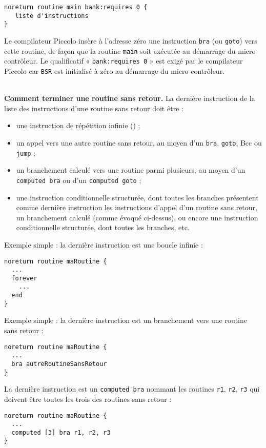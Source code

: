 \begin{lstlisting}[language=piccolo]
noreturn routine main bank:requires 0 {
   liste d'instructions
}

\end{lstlisting}

Le compilateur Piccolo insère à l’adresse zéro une instruction \texttt{bra} (ou \texttt{goto}) vers cette routine, de façon que la routine \texttt{main} soit exécutée au démarrage du micro-contrôleur. Le qualificatif « \texttt{bank:requires 0} » est exigé par le compilateur Piccolo car \texttt{BSR} est initialisé à zéro au démarrage du micro-contrôleur.


~\\
\textbf{Comment terminer une routine sans retour.} La dernière instruction de la liste des instructions d’une routine sans retour doit être :
\begin{itemize}
  \item une instruction de répétition infinie () ;
  \item un appel vers une autre routine sans retour, au moyen d’un \texttt{bra}, \texttt{goto}, Bcc ou \texttt{jump} ;
  \item un branchement calculé vers une routine parmi plusieurs, au moyen d’un \texttt{computed bra} ou d’un \texttt{computed goto} ;
  \item une instruction conditionnelle structurée, dont toutes les branches présentent comme dernière instruction les instructions d’appel d’un routine sans retour, un branchement calculé (comme évoqué ci-dessus), ou encore une instruction conditionnelle structurée, dont toutes les branches, etc.

\end{itemize}

Exemple simple : la dernière instruction est une boucle infinie :
\begin{lstlisting}[language=piccolo]
noreturn routine maRoutine {
  ...
  forever
    ...
  end
}
\end{lstlisting}

Exemple simple : la dernière instruction est un branchement vers une routine sans retour :
\begin{lstlisting}[language=piccolo]
noreturn routine maRoutine {
  ...
  bra autreRoutineSansRetour
}
\end{lstlisting}

La dernière instruction est un \texttt{computed bra} nommant les routines \texttt{r1}, \texttt{r2}, \texttt{r3} qui doivent être toutes les trois des routines sans retour :
\begin{lstlisting}[language=piccolo]
noreturn routine maRoutine {
  ...
  computed [3] bra r1, r2, r3
}
\end{lstlisting}

